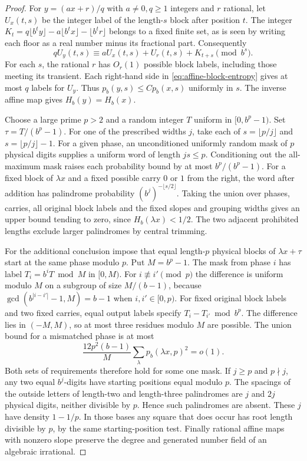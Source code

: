 \begin{proof}
For \(y=(ax+r)/q\) with \(a\ne0,q\ge1\) integers and \(r\) rational, let \(U_x(t,s)\) be the integer label of the length-\(s\) block after position \(t\). The integer \(K_t=q\lfloor b^t y\rfloor-a\lfloor b^t x\rfloor-\lfloor b^t r\rfloor\) belongs to a fixed finite set, as is seen by writing each floor as a real number minus its fractional part. Consequently
\begin{equation}\label{eq:affine-block-entropy}
 qU_y(t,s)\equiv aU_x(t,s)+U_r(t,s)+K_{t+s}\pmod{b^s}.
\end{equation}
For each \(s\), the rational \(r\) has \(O_r(1)\) possible block labels, including those meeting its transient. Each right-hand side in \eqref{eq:affine-block-entropy} gives at most \(q\) labels for \(U_y\). Thus \(p_b(y,s)\le C p_b(x,s)\) uniformly in \(s\). The inverse affine map gives \(H_b(y)=H_b(x)\).

Choose a large prime \(p>2\) and a random integer \(T\) uniform in \([0,b^p-1)\). Set \(\tau=T/(b^p-1)\). For one of the prescribed widths \(j\), take each of \(s=\lfloor p/j\rfloor\) and \(s=\lfloor p/j\rfloor-1\). For a given phase, an unconditioned uniformly random mask of \(p\) physical digits supplies a uniform word of length \(js\le p\). Conditioning out the all-maximum mask raises each probability bound by at most \(b^p/(b^p-1)\). For a fixed block of \(\lambda x\) and a fixed possible carry \(0\) or \(1\) from the right, the word after addition has palindrome probability \((b^j)^{-\lfloor s/2\rfloor}\). Taking the union over phases, carries, all original block labels and the fixed slopes and grouping widths gives an upper bound tending to zero, since \(H_b(\lambda x)<1/2\). The two adjacent prohibited lengths exclude larger palindromes by central trimming.

For the additional conclusion impose that equal length-\(p\) physical blocks of \(\lambda x+\tau\) start at the same phase modulo \(p\). Put \(M=b^p-1\). The mask from phase \(i\) has label \(T_i=b^iT\bmod M\) in \([0,M)\). For \(i\not\equiv i'\pmod p\) the difference is uniform modulo \(M\) on a subgroup of size \(M/(b-1)\), because \(\gcd(b^{|i-i'|}-1,M)=b-1\) when \(i,i'\in[0,p)\). For fixed original block labels and two fixed carries, equal output labels specify \(T_i-T_{i'}\bmod b^p\). The difference lies in \((-M,M)\), so at most three residues modulo \(M\) are possible. The union bound for a mismatched phase is at most
\[
       \frac{12p^2(b-1)}{M}\sum_\lambda p_b(\lambda x,p)^2=o(1).
\]
Both sets of requirements therefore hold for some one mask. If \(j\ge p\) and \(p\nmid j\), any two equal \(b^j\)-digits have starting positions equal modulo \(p\). The spacings of the outside letters of length-two and length-three palindromes are \(j\) and \(2j\) physical digits, neither divisible by \(p\). Hence such palindromes are absent. These \(j\) have density \(1-1/p\). In those bases any square that does occur has root length divisible by \(p\), by the same starting-position test. Finally rational affine maps with nonzero slope preserve the degree and generated number field of an algebraic irrational.
\end{proof}

